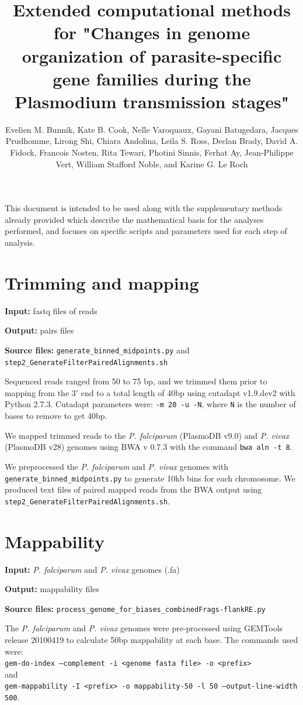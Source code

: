 \documentclass[11pt]{amsart}
\title{Extended computational methods for "Changes in genome organization of parasite-specific gene families during the Plasmodium transmission stages"}
\author{Evelien M. Bunnik, Kate B. Cook, Nelle Varoquaux, Gayani Batugedara, Jacques Prudhomme, Lirong Shi, Chiara Andolina, Leila S. Ross, Declan Brady, David A. Fidock, Francois Nosten, Rita Tewari, Photini Sinnis, Ferhat Ay, Jean-Philippe Vert, William Stafford Noble, and Karine G. Le Roch}
\begin{document}
\maketitle

This document is intended to be used along with the supplementary methods already provided which describe the mathematical basis for the analyses performed, and focuses on specific scripts and parameters used for each step of analysis.

\section{Trimming and mapping}

\textbf{Input:} fastq files of reads

\textbf{Output:} pairs files 

\textbf{Source files:} \texttt{generate\_binned\_midpoints.py} and \texttt{step2\_GenerateFilterPairedAlignments.sh}

Sequenced reads ranged from 50 to 75 bp, and we trimmed them prior to mapping from the 3$'$ end to a total length of 40bp using cutadapt v1.9.dev2 with Python 2.7.3. Cutadapt parameters were: \texttt{-m 20 -u -N}, where \texttt{N} is the number of bases to remove to get 40bp.

We mapped trimmed reads to the \textit{P. falciparum} (PlasmoDB v9.0) and \textit{P. vivax} (PlasmoDB v28) genomes using BWA v 0.7.3 with the command \texttt{bwa aln -t 8}.

We preprocessed the \textit{P. falciparum} and \textit{P. vivax} genomes with \texttt{generate\_binned\_midpoints.py} to generate 10kb bins for each chromosome. We produced text files of paired mapped reads from the BWA output using \texttt{step2\_GenerateFilterPairedAlignments.sh}.

\section{Mappability}

\textbf{Input:} \textit{P. falciparum} and \textit{P. vivax} genomes (.fa)

\textbf{Output:} mappability files 

\textbf{Source files:} \texttt{process\_genome\_for\_biases\_combinedFrags-flankRE.py}

The \textit{P. falciparum} and \textit{P. vivax} genomes were pre-processed using GEMTools release 20100419 to calculate 50bp mappability at each base. The commands used were:
\\
\texttt{gem-do-index --complement -i <genome fasta file> -o <prefix>}
\\
and
\\
\texttt{gem-mappability -I <prefix> -o mappability-50 -l 50 --output-line-width 500}.
\end{document}
